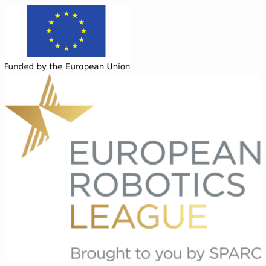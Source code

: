 
\thispagestyle{empty}

\begin{figure}
\begin{minipage}{.4\textwidth}
  \flushright
  \vspace*{0.8cm}    
  \includegraphics[height=2.9cm]{./fig/logos/EU_flag.pdf}
\end{minipage}%
\begin{minipage}{.5\textwidth}
  \flushleft
  \hspace*{60pt}
  \includegraphics[scale=0.26]{./fig/logos/E-Robotics_league_logo.pdf}
\end{minipage}
\end{figure}

